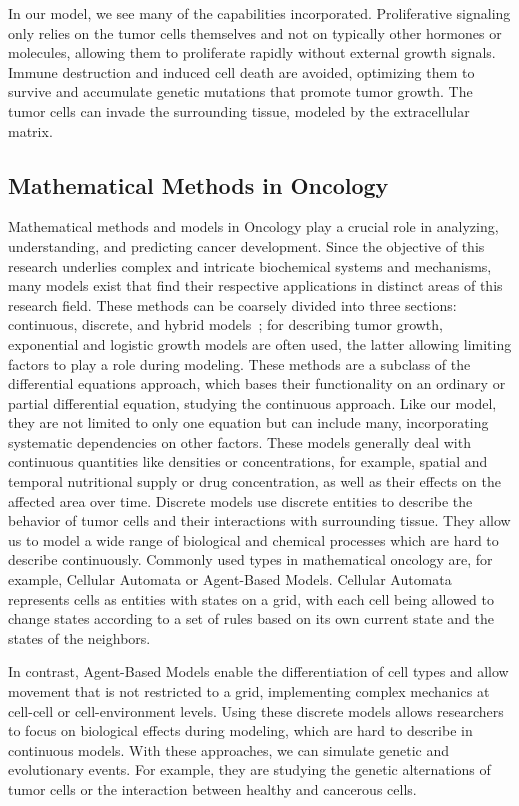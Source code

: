In our model, we see many of the capabilities incorporated. Proliferative signaling only relies on the tumor cells themselves and not on typically other hormones or molecules, allowing them to proliferate rapidly without external growth signals. Immune destruction and induced cell death are avoided, optimizing them to survive and accumulate genetic mutations that promote tumor growth. The tumor cells can invade the surrounding tissue, modeled by the extracellular matrix.

\subsection{Mathematical Methods in Oncology}
Mathematical methods and models in Oncology play a crucial role in analyzing, understanding, and predicting cancer development. Since the objective of this research underlies complex and intricate biochemical systems and mechanisms, many models exist that find their respective applications in distinct areas of this research field. These methods can be coarsely divided into three sections: continuous, discrete, and hybrid models~\cite{BEKISZ2020101198}; for describing tumor growth, exponential and logistic growth models are often used, the latter allowing limiting factors to play a role during modeling. These methods are a subclass of the differential equations approach, which bases their functionality on an ordinary or partial differential equation, studying the continuous approach. Like our model, they are not limited to only one equation but can include many, incorporating systematic dependencies on other factors. These models generally deal with continuous quantities like densities or concentrations, for example, spatial and temporal nutritional supply or drug concentration, as well as their effects on the affected area over time. Discrete models use discrete entities to describe the behavior of tumor cells and their interactions with surrounding tissue. They allow us to model a wide range of biological and chemical processes which are hard to describe continuously. Commonly used types in mathematical oncology are, for example, Cellular Automata or Agent-Based Models. Cellular Automata represents cells as entities with states on a grid, with each cell being allowed to change states according to a set of rules based on its own current state and the states of the neighbors.

In contrast, Agent-Based Models enable the differentiation of cell types and allow movement that is not restricted to a grid, implementing complex mechanics at cell-cell or cell-environment levels. Using these discrete models allows researchers to focus on biological effects during modeling, which are hard to describe in continuous models. With these approaches, we can simulate genetic and evolutionary events. For example, they are studying the genetic alternations of tumor cells or the interaction between healthy and cancerous cells.


